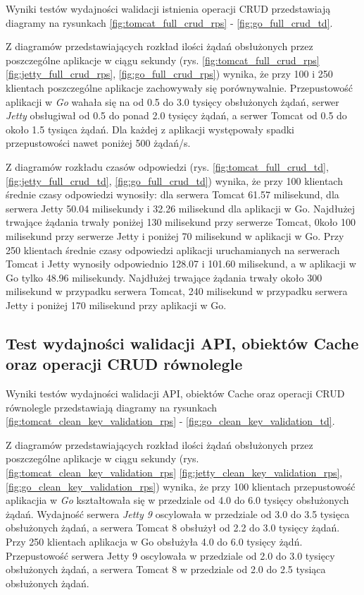 Wyniki testów wydajności walidacji istnienia operacji CRUD przedstawiają diagramy na rysunkach \ref{fig:tomcat_full_crud_rps} - \ref{fig:go_full_crud_td}.

Z diagramów przedstawiających rozkład ilości żądań obsłużonych przez poszczególne aplikacje w ciągu sekundy (rys. \ref{fig:tomcat_full_crud_rps} \ref{fig:jetty_full_crud_rps}, \ref{fig:go_full_crud_rps}) wynika, że przy 100 i 250 klientach poszczególne aplikacje zachowywały się porównywalnie. Przepustowość aplikacji w \textsl{Go} wahała się na od 0.5 do 3.0 tysięcy obsłużonych żądań, serwer \textsl{Jetty} obsługiwał od 0.5 do ponad 2.0 tysięcy żądań, a serwer Tomcat od 0.5 do około 1.5 tysiąca żądań. Dla każdej z aplikacji występowały spadki przepustowości nawet poniżej 500 żądań/s.

Z diagramów rozkładu czasów odpowiedzi (rys. \ref{fig:tomcat_full_crud_td}, \ref{fig:jetty_full_crud_td}, \ref{fig:go_full_crud_td}) wynika, że przy 100 klientach średnie czasy odpowiedzi wynosiły: dla serwera Tomcat 61.57 milisekund, dla serwera Jetty 50.04 milisekundy i 32.26 milisekund dla aplikacji w Go. Najdłużej trwające żądania trwały poniżej 130 milisekund przy serwerze Tomcat, 0koło 100 milisekund przy serwerze Jetty i poniżej 70 milisekund w aplikacji w Go. Przy 250 klientach średnie czasy odpowiedzi aplikacji uruchamianych na serwerach Tomcat i Jetty  wynosiły odpowiednio 128.07 i 101.60 milisekund, a w aplikacji w Go tylko 48.96 milisekundy. Najdłużej trwające żądania trwały około 300 milisekund w przypadku serwera Tomcat, 240 milisekund w przypadku serwera Jetty i poniżej 170 milisekund przy aplikacji w Go. 


\clearpage

\subsection{Test wydajności walidacji API, obiektów Cache oraz operacji CRUD równolegle }

Wyniki testów wydajności walidacji API, obiektów Cache oraz operacji CRUD równolegle przedstawiają diagramy na rysunkach \ref{fig:tomcat_clean_key_validation_rps} - \ref{fig:go_clean_key_validation_td}.              

Z diagramów przedstawiających rozkład ilości żądań obsłużonych przez poszczególne aplikacje w ciągu sekundy  (rys. \ref{fig:tomcat_clean_key_validation_rps} \ref{fig:jetty_clean_key_validation_rps}, \ref{fig:go_clean_key_validation_rps}) wynika, że przy 100 klientach przepustowość aplikacjia w \textsl{Go} kształtowała się w przedziale od 4.0 do 6.0 tysięcy obsłużonych żądań. Wydajność serwera \textsl{Jetty 9} oscylowała w przedziale od 3.0 do 3.5 tysięca obsłużonych żądań, a  serwera Tomcat 8 obsłużył od 2.2 do 3.0 tysięcy żądań. Przy 250 klientach aplikacja w Go obsłużyła 4.0 do 6.0 tysięcy żądń. Przepustowość serwera Jetty 9 oscylowała w przedziale od 2.0 do 3.0 tysięcy obsłużonych żądań, a serwera Tomcat 8 w przedziale od 2.0 do 2.5 tysiąca obsłużonych żądań.



